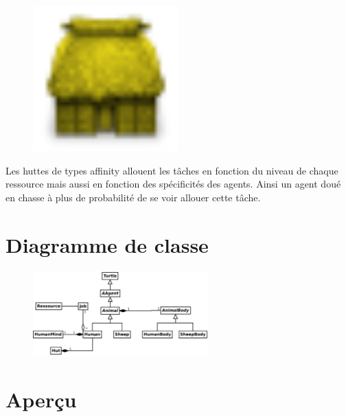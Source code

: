 \begin{minipage}[H]{0.1\linewidth}
  \begin{figure}[H]
    \begin{center}
      \includegraphics[width=0.5\textwidth]{./img/hut_affinity}
    \end{center}
  \end{figure}
\end{minipage}
\begin{minipage}[H]{0.9\linewidth}
  Les huttes de types \og{}affinity\fg{} allouent les tâches en
  fonction du niveau de chaque ressource mais aussi en fonction des
  spécificités des agents. Ainsi un agent doué en chasse à plus de
  probabilité de se voir allouer cette tâche.
\end{minipage}

\section{Diagramme de classe}
  \begin{figure}[H]
    \begin{center}
      \includegraphics[width=0.6\textwidth]{./diags/uml}
    \end{center}
  \end{figure}
\section{Aperçu}

